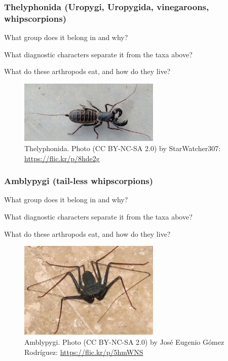 \documentclass[letterpaper, 11pt]{article}
\begin{document}
\subsubsection*{Thelyphonida (Uropygi, Uropygida, vinegaroons, whipscorpions)}
What group does it belong in and why?\vspace{1cm}

\noindent{}What diagnostic characters separate it from the taxa above?\vspace{1.5cm}

\noindent{}What do these arthropods eat, and how do they live?\vspace{1.5cm}

\begin{figure}[ht!]
  \centering
    \includegraphics[width=0.6\textwidth]{thelyphonida}
  \caption{Thelyphonida. Photo (CC BY-NC-SA 2.0) by StarWatcher307: \url{https://flic.kr/p/8hde2g}}
  \label{fig:thelyphonida}
\end{figure}

\subsubsection*{Amblypygi (tail-less whipscorpions)}
What group does it belong in and why?\vspace{1cm}

\noindent{}What diagnostic characters separate it from the taxa above?\vspace{1.5cm}

\noindent{}What do these arthropods eat, and how do they live?\vspace{1.5cm}

\begin{figure}[ht!]
  \centering
    \includegraphics[width=0.6\textwidth]{ambly1}
  \caption{Amblypygi. Photo (CC BY-NC-SA 2.0) by Jos\'{e} Eugenio G\'{o}mez Rodr\'{i}guez: \url{https://flic.kr/p/5hmWNS} }
  \label{fig:ambly1}
\end{figure}
\end{document}
